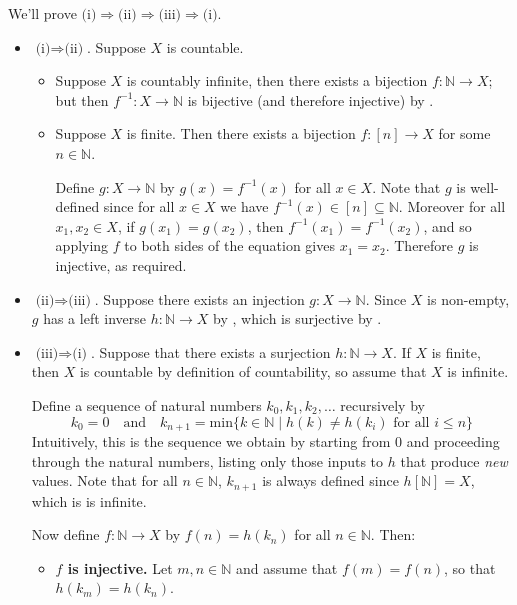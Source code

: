 \begin{cproof}
We'll prove $\text{(i)} \Rightarrow \text{(ii)} \Rightarrow \text{(iii)} \Rightarrow \text{(i)}$.

\begin{itemize}
\item $\text{(i)} \Rightarrow \text{(ii)}$. Suppose $X$ is countable.
\begin{itemize}
\item Suppose $X$ is countably infinite, then there exists a bijection $f : \mathbb{N} \to X$; but then $f^{-1} : X \to \mathbb{N}$ is bijective (and therefore injective) by .
\item Suppose $X$ is finite. Then there exists a bijection $f : [n] \to X$ for some $n \in \mathbb{N}$.

Define $g : X \to \mathbb{N}$ by $g(x) = f^{-1}(x)$ for all $x \in X$. Note that $g$ is well-defined since for all $x \in X$ we have $f^{-1}(x) \in [n] \subseteq \mathbb{N}$. Moreover for all $x_1,x_2 \in X$, if $g(x_1)=g(x_2)$, then $f^{-1}(x_1) = f^{-1}(x_2)$, and so applying $f$ to both sides of the equation gives $x_1=x_2$. Therefore $g$ is injective, as required.
\end{itemize}

\item $\text{(ii)} \Rightarrow \text{(iii)}$. Suppose there exists an injection $g : X \to \mathbb{N}$. Since $X$ is non-empty, $g$ has a left inverse $h : \mathbb{N} \to X$ by , which is surjective by .

\item $\text{(iii)} \Rightarrow \text{(i)}$. Suppose that there exists a surjection $h : \mathbb{N} \to X$. If $X$ is finite, then $X$ is countable by definition of countability, so assume that $X$ is infinite.

Define a sequence of natural numbers $k_0,k_1,k_2,\dots$ recursively by
\[ k_0 = 0 \quad \text{and} \quad k_{n+1} = \mathrm{min} \{ k \in \mathbb{N} \mid h(k) \ne h(k_i) \text{ for all } i \le n \} \] 
Intuitively, this is the sequence we obtain by starting from $0$ and proceeding through the natural numbers, listing only those inputs to $h$ that produce \textit{new} values. Note that for all $n \in \mathbb{N}$, $k_{n+1}$ is always defined since $h[\mathbb{N}] = X$, which is is infinite.

Now define $f : \mathbb{N} \to X$ by $f(n) = h(k_n)$ for all $n \in \mathbb{N}$. Then:
\begin{itemize}
\item \textbf{$f$ is injective.} Let $m,n \in \mathbb{N}$ and assume that $f(m)=f(n)$, so that $h(k_m) = h(k_n)$.


\end{itemize}
\end{itemize}
\end{cproof}
